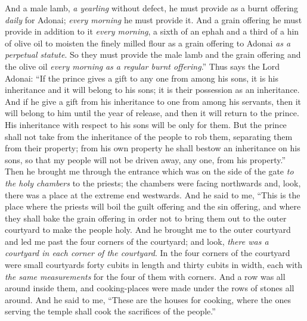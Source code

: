 \begin{biblechapter}
\verse And a male lamb, \textit{a yearling} without defect, he must provide as a burnt offering \textit{daily} for Adonai; \textit{every morning} he must provide it.
\verse And a grain offering he must provide in addition to it \textit{every morning}, a sixth of an ephah and a third of a hin of olive oil to moisten the finely milled flour as a grain offering to Adonai \textit{as a perpetual statute}.
\verse So they must provide the male lamb and the grain offering and the olive oil \textit{every morning} \textit{as a regular burnt offering}.”
\verse Thus says the Lord Adonai: “If the prince gives a gift to any one from among his sons, it is his inheritance and it will belong to his sons; it is their possession as an inheritance.
\verse And if he give a gift from his inheritance to one from among his servants, then it will belong to him until the year of release, and then it will return to the prince. His inheritance with respect to his sons will be only for them.
\verse But the prince shall not take from the inheritance of the people to rob them, separating them from their property; from his own property he shall bestow an inheritance on his sons, so that my people will not be driven away, any one, from his property.”
\verse Then he brought me through the entrance which was on the side of the gate \textit{to the holy chambers} to the priests; the chambers were facing northwards and, look, there was a place at the extreme end westwards.
\verse And he said to me, “This is the place where the priests will boil the guilt offering and the sin offering, and where they shall bake the grain offering in order not to bring them out to the outer courtyard to make the people holy.
\verse And he brought me to the outer courtyard and led me past the four corners of the courtyard; and look, \textit{there was a courtyard in each corner of the courtyard}.
\verse In the four corners of the courtyard were small courtyards forty cubits in length and thirty cubits in width, each with \textit{the same measurements} for the four of them with corners.
\verse And a row was all around inside them, and cooking-places were made under the rows of stones all around.
\verse And he said to me, “These are the houses for cooking, where the ones serving the temple shall cook the sacrifices of the people.”
\end{biblechapter}


